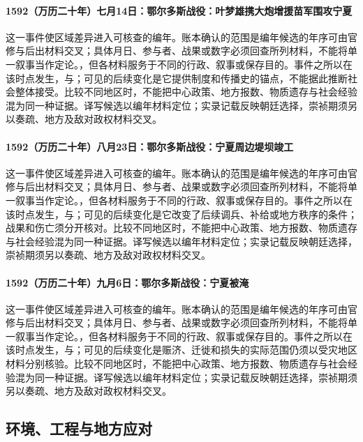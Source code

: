 \paragraph{1592（万历二十年）七月14日：鄂尔多斯战役：叶梦雄携大炮增援苗军围攻宁夏} 这一事件使区域差异进入可核查的编年。账本确认的范围是编年候选的年序可由官修与后出材料交叉；具体月日、参与者、战果或数字必须回查所列材料，不能将单一叙事当作定论。，但各材料服务于不同的行政、叙事或保存目的。事件之所以在该时点发生，与；可见的后续变化是它提供制度和传播史的锚点，不能据此推断社会整体接受。比较不同地区时，不能把中心政策、地方报数、物质遗存与社会经验混为同一种证据。译写候选以编年材料定位；实录记载反映朝廷选择，崇祯期须另以奏疏、地方及敌对政权材料交叉。

\paragraph{1592（万历二十年）八月23日：鄂尔多斯战役：宁夏周边堤坝竣工} 这一事件使区域差异进入可核查的编年。账本确认的范围是编年候选的年序可由官修与后出材料交叉；具体月日、参与者、战果或数字必须回查所列材料，不能将单一叙事当作定论。，但各材料服务于不同的行政、叙事或保存目的。事件之所以在该时点发生，与；可见的后续变化是它改变了后续调兵、补给或地方秩序的条件；战果和伤亡须分开核对。比较不同地区时，不能把中心政策、地方报数、物质遗存与社会经验混为同一种证据。译写候选以编年材料定位；实录记载反映朝廷选择，崇祯期须另以奏疏、地方及敌对政权材料交叉。

\paragraph{1592（万历二十年）九月6日：鄂尔多斯战役：宁夏被淹} 这一事件使区域差异进入可核查的编年。账本确认的范围是编年候选的年序可由官修与后出材料交叉；具体月日、参与者、战果或数字必须回查所列材料，不能将单一叙事当作定论。，但各材料服务于不同的行政、叙事或保存目的。事件之所以在该时点发生，与；可见的后续变化是赈济、迁徙和损失的实际范围仍须以受灾地区材料分别核验。比较不同地区时，不能把中心政策、地方报数、物质遗存与社会经验混为同一种证据。译写候选以编年材料定位；实录记载反映朝廷选择，崇祯期须另以奏疏、地方及敌对政权材料交叉。

\subsection{环境、工程与地方应对}

